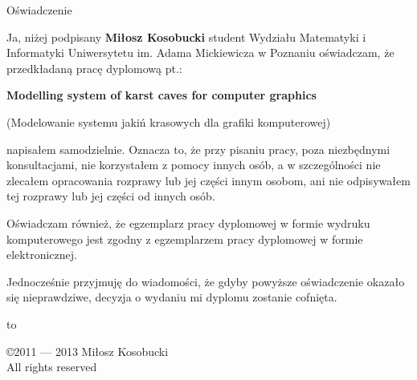 \documentclass[twoside,openright,a4paper,12pt]{memoir}
\theoremstyle{definition}
\begin{document}
\listoftodos

\begin{center}
  \LARGE{Oświadczenie}
\end{center}

Ja, niżej podpisany \textbf{Miłosz Kosobucki} student Wydziału
Matematyki i Informatyki Uniwersytetu im. Adama Mickiewicza w Poznaniu
oświadczam, że przedkładaną pracę dyplomową pt.:

\textbf{Modelling system of karst caves for computer graphics}

(Modelowanie systemu jakiń krasowych dla grafiki komputerowej)

napisałem samodzielnie. Oznacza to, że przy pisaniu pracy, poza niezbędnymi
konsultacjami, nie korzystałem z pomocy innych osób, a w szczególności nie
zlecałem opracowania rozprawy lub jej części innym osobom, ani nie
odpisywałem tej rozprawy lub jej części od innych osób.

Oświadczam również, że egzemplarz pracy dyplomowej w formie wydruku
komputerowego jest zgodny z egzemplarzem pracy dyplomowej w formie
elektronicznej.

Jednocześnie przyjmuję do wiadomości, że gdyby powyższe oświadczenie
okazało się nieprawdziwe, decyzja o wydaniu mi dyplomu zostanie cofnięta.

\newcommand{\kropki}[2]{%
  \vbox{%
    \hbox to #1{\dotfill}%
    \vspace{4pt}%
    \hbox to #1{\hss #2\hss}%
  }
}
\vspace{1cm}
\hbox to \textwidth{%
  \hfil
  \kropki{4cm}{data}%
  \hfil\hfil
  \kropki{4cm}{podpis}%
  \hfil
}%
\newpage

\begingroup
\footnotesize
\setlength{\parindent}{0pt}
\setlength{\parskip}{\baselineskip}
\newpage\null\thispagestyle{empty}\newpage
\copyright 2011 --- 2013 Miłosz Kosobucki \\
All rights reserved
\endgroup

\tableofcontents









\printbibliography
\end{document}
